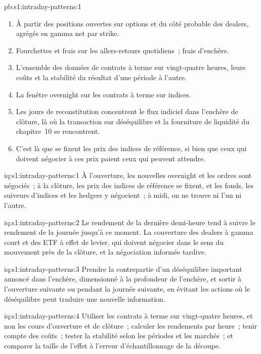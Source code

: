 \begin{solution}{pb:s1:intraday-patterns:1}
\begin{enumerate}
\item À partir des positions ouvertes sur options et du côté probable des dealers, agrégés en gamma net par strike.
\item Fourchettes et frais sur les allers-retours quotidiens~; frais d'enchère.
\item L'ensemble des données de contrats à terme sur vingt-quatre heures, leurs coûts et la stabilité du résultat d'une période à l'autre.
\item La fenêtre overnight sur les contrats à terme sur indices.
\item Les jours de reconstitution concentrent le flux indiciel dans l'enchère de clôture, là où la transaction sur déséquilibre et la fourniture de liquidité du chapitre~10 se rencontrent.
\item C'est là que se fixent les prix des indices de référence, si bien que ceux qui doivent négocier à ces prix paient ceux qui peuvent attendre.
\end{enumerate}
\end{solution}

\begin{solution}{iq:s1:intraday-patterns:1}
À l'ouverture, les nouvelles overnight et les ordres sont négociés~; à la clôture, les prix des indices de référence se fixent, et les fonds, les suiveurs d'indices et les hedgers y négocient~; à midi, on ne trouve
ni l'un ni l'autre.
\end{solution}

\begin{solution}{iq:s1:intraday-patterns:2}
Le rendement de la dernière demi-heure tend à suivre le rendement de la journée jusqu'à ce moment. La couverture des dealers à gamma court et des ETF à effet de levier, qui doivent négocier dans le
sens du mouvement près de la clôture, et la négociation informée tardive.
\end{solution}

\begin{solution}{iq:s1:intraday-patterns:3}
Prendre la contrepartie d'un déséquilibre important annoncé dans l'enchère, dimensionné à la profondeur de l'enchère, et sortir à l'ouverture suivante ou pendant la journée suivante, en évitant
les actions où le déséquilibre peut traduire une nouvelle information.
\end{solution}

\begin{solution}{iq:s1:intraday-patterns:4}
Utiliser les contrats à terme sur vingt-quatre heures, et non les cours d'ouverture et de clôture~; calculer les rendements par heure~; tenir compte des coûts~; tester la stabilité selon les périodes et les marchés~; et comparer
la taille de l'effet à l'erreur d'échantillonnage de la découpe.
\end{solution}

